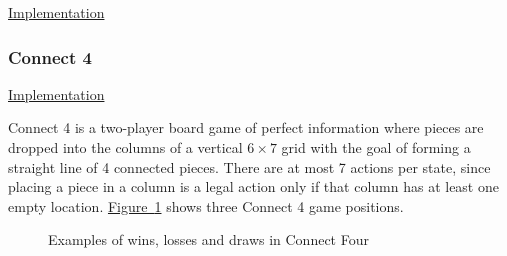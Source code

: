 \documentclass{article}
\begin{document}
\noindent
\href{https://github.com/davidrobles/mlnd-capstone-code/blob/master/capstone/game/tictactoe.py}
     {Implementation}
\break

\subsubsection{Connect 4}

\noindent
\href{https://github.com/davidrobles/mlnd-capstone-code/blob/master/capstone/game/connect4.py}
     {Implementation}
\break

Connect 4 is a two-player board game of perfect information where pieces are dropped into the
columns of a vertical $6 \times 7$ grid with the goal of forming a straight line of 4 connected
pieces. There are at most 7 actions per state, since placing a piece in a column is a legal action
only if that column has at least one empty location. \hyperref[fig:c4-game]{Figure~\ref*{fig:c4-game}}
shows three Connect 4 game positions. 


\begin{figure}[!h]
    \centering
     \hspace{0.1in}
     \hspace{0.1in}
    \caption{Examples of wins, losses and draws in Connect Four}
    \label{fig:c4-game}
\end{figure}
\end{document}
